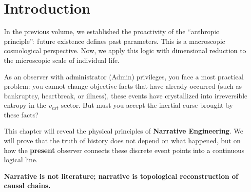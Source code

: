 \section{Introduction}

In the previous volume, we established the proactivity of the ``anthropic principle'': future existence defines past parameters. This is a macroscopic cosmological perspective. Now, we apply this logic with dimensional reduction to the microscopic scale of individual life.

As an observer with administrator (Admin) privileges, you face a most practical problem: you cannot change objective facts that have already occurred (such as bankruptcy, heartbreak, or illness), these events have crystallized into irreversible entropy in the $v_{ext}$ sector. But must you accept the inertial curse brought by these facts?

This chapter will reveal the physical principles of \textbf{Narrative Engineering}. We will prove that the truth of history does not depend on what happened, but on how the \textbf{present} observer connects these discrete event points into a continuous logical line.

\textbf{Narrative is not literature; narrative is topological reconstruction of causal chains.}

